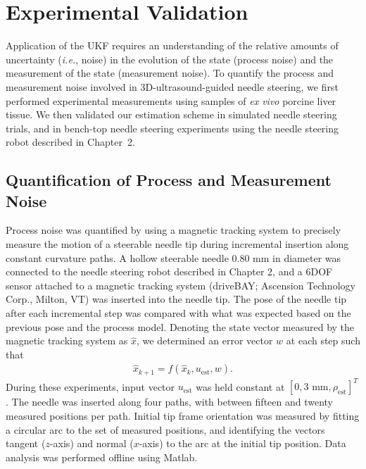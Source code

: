 \section{Experimental Validation}
\label{sec:AutonomousControl}
Application of the UKF requires an understanding of the relative amounts of uncertainty (\textit{i.e.}, noise) in the evolution of the state (process noise) and the measurement of the state (measurement noise). To quantify the process and measurement noise involved in 3D-ultrasound-guided needle steering, we first performed experimental measurements using samples of \textit{ex vivo} porcine liver tissue. We then validated our estimation scheme in simulated needle steering trials, and in bench-top needle steering experiments using the needle steering robot described in Chapter~2.

\subsection{Quantification of Process and Measurement Noise}
Process noise was quantified by using a magnetic tracking system to precisely measure the motion of a steerable needle tip during incremental insertion along constant curvature paths. A hollow steerable needle 0.80 mm in diameter was connected to the needle steering robot described in Chapter 2, and a 6DOF sensor attached to a magnetic tracking system (driveBAY; Ascension Technology Corp., Milton, VT) was inserted into the needle tip. The pose of the needle tip after each incremental step was compared with what was expected based on the previous pose and the process model. Denoting the state vector measured by the magnetic tracking system as $\hat{{x}}$, we determined an error vector ${w}$ at each step such that
\begin{align}
{\hat{x}_{k+1}} = f({\hat{x}_{k}}, {u_{\text{est}}}, {w}).
\end{align}
During these experiments, input vector ${u_{\text{est}}}$ was held constant at $[0, \text{3 mm}, \rho_{\text{est}}]^{T}$. The needle was inserted along four paths, with between fifteen and twenty measured positions per path. Initial tip frame orientation was measured by fitting a circular arc to the set of measured positions, and identifying the vectors tangent ($z$-axis) and normal ($x$-axis) to the arc at the initial tip position. Data analysis was performed offline using Matlab. 

